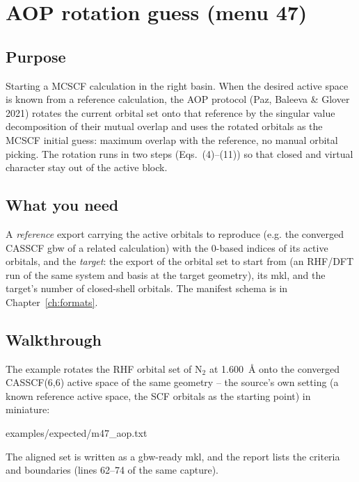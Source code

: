 \chapter{AOP rotation guess (menu 47)}
\label{ch:menu47}

\section{Purpose}

Starting a MCSCF calculation in the right basin.  When the desired active
space is known from a reference calculation, the AOP protocol (Paz, Baleeva
\& Glover 2021) rotates the current orbital set onto that reference by the
singular value decomposition of their mutual overlap and uses the rotated
orbitals as the MCSCF initial guess: maximum overlap with the reference, no
manual orbital picking.  The rotation runs in two steps
(Eqs.~(4)--(11)) so that closed and virtual character stay out of the active
block.

\section{What you need}

A \emph{reference} export carrying the active orbitals to reproduce (e.g.
the converged CASSCF gbw of a related calculation) with the 0-based indices
of its active orbitals, and the \emph{target}: the  export
of the orbital set to start from (an RHF/DFT run of the same system and
basis at the target geometry), its mkl, and the target's number of
closed-shell orbitals.  The manifest schema is in
Chapter~\ref{ch:formats}.

\section{Walkthrough}

The example rotates the RHF orbital set of N$_2$ at 1.600~\AA{} onto the
converged CASSCF(6,6) active space of the same geometry -- the source's own
setting (a known reference active space, the SCF orbitals as the starting
point) in miniature:


  {examples/expected/m47_aop.txt}

The aligned set is written as a gbw-ready mkl, and the report lists the
criteria and boundaries (lines 62--74 of the same capture).

